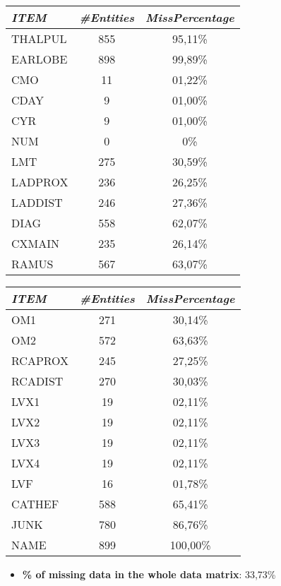 \documentclass[a4paper,12pt]{article}
\begin{document}
        \begin{multicols}{2}

            \begin{tabular}{|l|c|c|} \hline

                \textit{ITEM} 	& \textit{\#Entities}	& \textit{MissPercentage} \\
                \hline THALPUL	&	855		&	95,11\% \\
                \hline EARLOBE	&	898		&	99,89\% \\
                \hline CMO		&	11	&	01,22\% \\
                \hline CDAY		&	9	&	01,00\% \\
                \hline CYR		&	9	&	01,00\% \\
                \hline NUM		&	0	&	0\% \\
                \hline LMT		&	275	&	30,59\% \\
                \hline LADPROX	&	236	&	26,25\% \\
                \hline LADDIST	&	246	&	27,36\% \\
                \hline DIAG		&	558	&	62,07\% \\
                \hline CXMAIN	&	235	&	26,14\% \\
                \hline RAMUS	&	567	&	63,07\% \\ \hline

            \end{tabular}

            \begin{tabular}{|l|c|c|} \hline

                \textit{ITEM} 	& \textit{\#Entities}	& \textit{MissPercentage} \\
                \hline OM1		&	271	&	30,14\% \\
                \hline OM2		&	572	&	63,63\% \\
                \hline RCAPROX	&	245	&	27,25\% \\
                \hline RCADIST	&	270	&	30,03\% \\
                \hline LVX1		&	19	&	02,11\% \\
                \hline LVX2		&	19	&	02,11\% \\
                \hline LVX3		&	19	&	02,11\% \\
                \hline LVX4		&	19	&	02,11\% \\
                \hline LVF		&	16	&	01,78\% \\
                \hline CATHEF	&	588	&	65,41\% \\
                \hline JUNK		&	780	&	86,76\% \\
                \hline NAME		&	899	&	100,00\% \\ \hline

            \end{tabular}
	\end{multicols}

    \begin{itemize}
        \item \textbf{\% of missing data in the whole data matrix}: 33,73\%

    \end{itemize}
\end{document}
